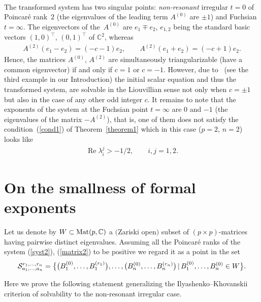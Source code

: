 \documentclass[pdftex]{sigma}
\numberwithin{equation}{section}
\begin{document}
\begin{Example}
\begin{gather*}
\end{gather*}
The transformed system has two singular points: {\it non-resonant} irregular $t=0$ of Poincar\'e rank~$2$ (the eigenvalues of the leading term $A^{(0)}$ are $\pm1$) and Fuchsian $t=\infty$. The eigenvectors of the~$A^{(0)}$ are $e_1\mp e_2$, $e_{1,2}$ being the standard basic vectors $(1,0)^{\top}$, $(0,1)^{\top}$ of ${\mathbb C}^2$, whereas
\begin{gather*}
A^{(2)}(e_1-e_2)=(-c-1)e_2, \qquad A^{(2)}(e_1+e_2)=(-c+1)e_2.
\end{gather*}
Hence, the matrices $A^{(0)}$, $A^{(2)}$ are simultaneously triangularizable (have a common eigenvector) if and only if $c=1$ or $c=-1$. However, due to~\cite{MMN} (see the third example in our Introduction) the initial scalar equation and thus the transformed system, are solvable in the Liouvillian sense not only when $c=\pm1$ but also in the case of any other odd integer $c$. It remains to note that the exponents of the system at the Fuchsian point $t=\infty$ are $0$ and $-1$ (the eigenvalues of the matrix $-A^{(2)}$), that is, one of them does not satisfy the condition~(\ref{cond1}) of Theorem~\ref{theorem1} which in this case ($p=2$, $n=2$) looks like
\begin{gather*}
\operatorname{Re}\lambda_i^j>-1/2, \qquad i,j=1,2.
\end{gather*}
\end{Example}

\section{On the smallness of formal exponents}\label{section3}

Let us denote by $W\subset{\rm Mat}(p,{\mathbb C})$ a $($Zariski open$)$ subset of $(p\times p)$-matrices having pairwise
distinct eigenvalues. Assuming all the Poincar\'e ranks of the system (\ref{syst2}), (\ref{matrix2}) to be positive we regard it as a point in the set
\begin{gather*}
{\cal S}_{a_1,\ldots,a_n}^{r_1,\ldots,r_n}=\bigl\{ \big(B^{(0)}_1,\ldots,B^{(r_1)}_1\big),\ldots,\big(B^{(0)}_n,\ldots,B^{(r_n)}_n\big) \,|\, B^{(0)}_1,\ldots,B^{(0)}_n \in W \bigr\}.
\end{gather*}

Here we prove the following statement generalizing the Ilyashenko--Khovanskii criterion of solvability to the non-resonant
irregular case.
\end{document}

